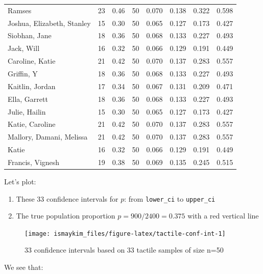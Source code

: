 \documentclass[12pt,]{krantz}
\providecommand{\tightlist}{%
  \setlength{\itemsep}{0pt}\setlength{\parskip}{0pt}}
\theoremstyle{definition}
\theoremstyle{definition}
\theoremstyle{definition}
\theoremstyle{remark}
\begin{document}
\begin{longtable}{lrrrrrrr}
\addlinespace
Ramses & 23 & 0.46 & 50 & 0.070 & 0.138 & 0.322 & 0.598\\
Joshua, Elizabeth, Stanley & 15 & 0.30 & 50 & 0.065 & 0.127 & 0.173 & 0.427\\
Siobhan, Jane & 18 & 0.36 & 50 & 0.068 & 0.133 & 0.227 & 0.493\\
Jack, Will & 16 & 0.32 & 50 & 0.066 & 0.129 & 0.191 & 0.449\\
Caroline, Katie & 21 & 0.42 & 50 & 0.070 & 0.137 & 0.283 & 0.557\\
\addlinespace
Griffin, Y & 18 & 0.36 & 50 & 0.068 & 0.133 & 0.227 & 0.493\\
Kaitlin, Jordan & 17 & 0.34 & 50 & 0.067 & 0.131 & 0.209 & 0.471\\
Ella, Garrett & 18 & 0.36 & 50 & 0.068 & 0.133 & 0.227 & 0.493\\
Julie, Hailin & 15 & 0.30 & 50 & 0.065 & 0.127 & 0.173 & 0.427\\
Katie, Caroline & 21 & 0.42 & 50 & 0.070 & 0.137 & 0.283 & 0.557\\
\addlinespace
Mallory, Damani, Melissa & 21 & 0.42 & 50 & 0.070 & 0.137 & 0.283 & 0.557\\
Katie & 16 & 0.32 & 50 & 0.066 & 0.129 & 0.191 & 0.449\\
Francis, Vignesh & 19 & 0.38 & 50 & 0.069 & 0.135 & 0.245 & 0.515\\*
\end{longtable}

\endgroup{}

Let's plot:

\begin{enumerate}
\def\labelenumi{\arabic{enumi}.}
\tightlist
\item
  These 33 confidence intervals for \(p\): from \texttt{lower\_ci} to
  \texttt{upper\_ci}
\item
  The true population proportion \(p = 900 / 2400 = 0.375\) with a red
  vertical line
\end{enumerate}

\begin{figure}

{\centering \texttt{[image: ismaykim\_files/figure-latex/tactile-conf-int-1]} 

}

\caption{33 confidence intervals based on 33 tactile samples of size n=50}\label{fig:tactile-conf-int}
\end{figure}

We see that:
\end{document}
